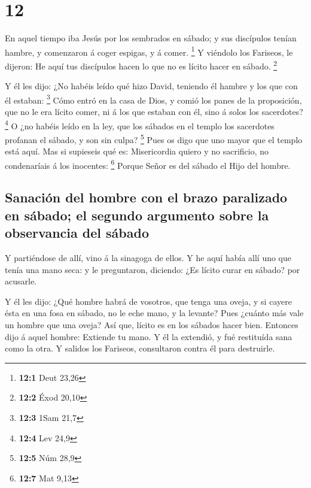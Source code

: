 \hypertarget{section-11}{%
\section{12}\label{section-11}}

 En aquel tiempo iba Jesús por los sembrados en sábado; y
sus discípulos tenían hambre, y comenzaron á coger espigas, y á comer.
\footnote{\textbf{12:1} Deut 23,26}  Y viéndolo los
Fariseos, le dijeron: He aquí tus discípulos hacen lo que no es lícito
hacer en sábado. \footnote{\textbf{12:2} Éxod 20,10}

 Y él les dijo: ¿No habéis leído qué hizo David, teniendo él
hambre y los que con él estaban: \footnote{\textbf{12:3} 1Sam 21,7}
 Cómo entró en la casa de Dios, y comió los panes de la
proposición, que no le era lícito comer, ni á los que estaban con él,
sino á solos los sacerdotes? \footnote{\textbf{12:4} Lev 24,9}
 O ¿no habéis leído en la ley, que los sábados en el templo
los sacerdotes profanan el sábado, y son sin culpa? \footnote{\textbf{12:5}
  Núm 28,9}  Pues os digo que uno mayor que el templo está
aquí.  Mas si supieseis qué es: Misericordia quiero y no
sacrificio, no condenaríais á los inocentes: \footnote{\textbf{12:7} Mat
  9,13}  Porque Señor es del sábado el Hijo del hombre.

\hypertarget{sanaciuxf3n-del-hombre-con-el-brazo-paralizado-en-suxe1bado-el-segundo-argumento-sobre-la-observancia-del-suxe1bado}{%
\subsection{Sanación del hombre con el brazo paralizado en sábado; el
segundo argumento sobre la observancia del
sábado}\label{sanaciuxf3n-del-hombre-con-el-brazo-paralizado-en-suxe1bado-el-segundo-argumento-sobre-la-observancia-del-suxe1bado}}

 Y partiéndose de allí, vino á la sinagoga de ellos.
 Y he aquí había allí uno que tenía una mano seca: y le
preguntaron, diciendo: ¿Es lícito curar en sábado? por acusarle.

 Y él les dijo: ¿Qué hombre habrá de vosotros, que tenga
una oveja, y si cayere ésta en una fosa en sábado, no le eche mano, y la
levante?  Pues ¿cuánto más vale un hombre que una oveja?
Así que, lícito es en los sábados hacer bien.  Entonces
dijo á aquel hombre: Extiende tu mano. Y él la extendió, y fué
restituída sana como la otra.  Y salidos los Fariseos,
consultaron contra él para destruirle.

